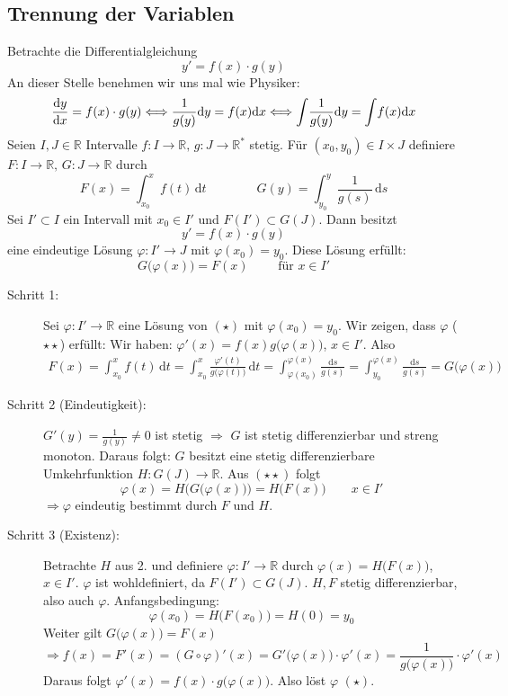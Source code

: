 \subsection{Trennung der Variablen} %
\label{sub:21}
Betrachte die Differentialgleichung
\[
	y' = f(x) \cdot g(y) \tag{$\star$}
\]
An dieser Stelle benehmen wir uns mal wie Physiker:
\[
	\frac{\mathrm{d} y}{\mathrm{d} x}  = f(x) \cdot g(y) \Longleftrightarrow \frac{1}{g(y)} \mathrm{d}y = f(x) \mathrm{d}x \Longleftrightarrow \int \! \frac{1}{g(y)} \mathrm{d}y = \int \! f(x) \mathrm{d}x
\]
 Seien $I,J \in \mathds{R}$ Intervalle $f:  I \to \mathds{R},\, g : J \to \mathds{R}^*$ stetig. Für $(x_0, y_0) \in I \times J$ definiere 
$F : I \to \mathds{R},\, G : J \to \mathds{R}$ durch
\[
	F(x) = \int_{x_0} ^{x} \! f(t)  \, \mathrm{d}t \qquad \qquad G(y) = \int_{y_0} ^{y} \! \frac{1}{g(s)}  \, \mathrm{d}s 
\]
Sei $I' \subset I$ ein Intervall mit $x_0 \in I'$ und $F(I') \subset G(J)$. Dann besitzt 
\[
	y' =  f(x) \cdot g(y) \tag{$\star$}
\]
eine eindeutige Lösung $\varphi : I' \to J$ mit $\varphi(x_0)= y_0$. Diese Lösung erfüllt: 
\[
	G\big(\varphi(x)\big) = F(x) \qquad \text{ für } x \in I' \tag{$\star\star$}
\]
\begin{description}
	\item[Schritt 1:] Sei $\varphi : I' \to \mathds{R}$ eine Lösung von $(\star)$ mit $\varphi(x_0)=y_0$. Wir zeigen, dass $\varphi$ ($\star\star$) erfüllt:
	Wir haben: $\varphi'(x) = f(x) g\big(\varphi(x)\big)$, $x \in I'$. Also 
	\begin{align*}
		F(x) = \int_{x_0} ^{x} \! f(t)  \, \mathrm{d}t = \int_{x_0} ^{x} \! \frac{\varphi'(t)}{g\big( \varphi(t)\big)}  \, \mathrm{d}t 
		= \int_{\varphi(x_0)} ^{\varphi(x)} \! \frac{ \mathrm{d}s}{g(s)} = \int_{y_0} ^{\varphi(x)} \! \frac{ \mathrm{d}s}{g(s)} = G \big( \varphi(x)\big)   
	\end{align*} 
	\item[Schritt 2 (Eindeutigkeit):] $G'(y)= \frac{1}{g(y)} \not= 0 $ ist stetig $\Rightarrow $ $G$ ist stetig differenzierbar und streng monoton. 
	Daraus folgt: $G$ besitzt eine stetig
	differenzierbare Umkehrfunktion $H : G(J) \to \mathds{R}$. Aus $(\star\star)$ folgt
	\[
		\varphi(x) = H\Big(G\big(\varphi(x)\big)\Big) = H\big(F(x)\big) \qquad x \in I'
	\]
	$\Rightarrow \varphi$ eindeutig bestimmt durch $F$ und $H$.
	\item[Schritt 3 (Existenz):] Betrachte $H$ aus 2. und definiere $\varphi : I'  \to \mathds{R}$ durch $\varphi(x) = H \big( F(x)\big)$, $x \in I'$. $\varphi$ ist
	wohldefiniert, da $F(I') \subset G(J)$. $H,F$ stetig differenzierbar, also auch $\varphi$. Anfangsbedingung:
	\[
		\varphi(x_0) = H \big(F(x_0) \big) = H(0) = y_0
	\]
	Weiter gilt $G \big(\varphi(x) \big) = F(x)$
	\[
		\Rightarrow f(x)= F'(x) = (G \circ \varphi)' (x)= G'\big(\varphi(x)\big) \cdot \varphi'(x) = \frac{1}{g\big(\varphi(x)\big)} \cdot \varphi'(x) 
	\]
	Daraus folgt $\varphi'(x)= f(x) \cdot g\big(\varphi(x)\big)$. Also löst $\varphi$ $(\star)$. \bewende
\end{description}

